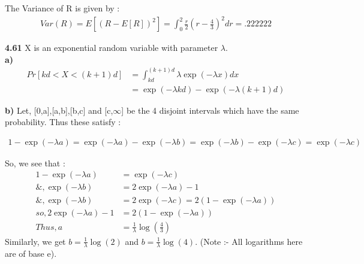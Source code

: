 \documentclass{article}
\begin{document}
The Variance of R is given by :
\begin{align*}
Var(R) = E[{(R-E[R])}^2] = \int_{0}^{2}\frac{r}{2}(r - \frac{4}{3})^2 dr = .222222
\end{align*}

\vspace{ 5 mm}

{\bf 4.61} X is an exponential random variable with parameter $\lambda$. \\

{\bf a)} 
\begin{align*}
Pr[kd < X < (k + 1)d] &= \int_{k d}^{(k+1) d} \lambda \exp(-\lambda x) dx \\
                     &= \exp(-\lambda k d) - \exp(-\lambda (k+1) d)
\end{align*}

\vspace{2 mm}

{\bf b)}  Let, [0,a],[a,b],[b,c] and [c,$\infty$] be the 4 disjoint intervals which have the same probability. Thus these satisfy :

\begin{align*}
 1- \exp(-\lambda a) = \exp(-\lambda a) - \exp(-\lambda b) = \exp(-\lambda b) - \exp(-\lambda c) = \exp(-\lambda c)
\end{align*}
 
So, we see that : 
\begin{align*}
1- \exp(-\lambda a) &=  \exp(-\lambda c) \\
\&, \exp(-\lambda b) &= 2 \exp(-\lambda a) -1 \\
\&, \exp(-\lambda b) &= 2 \exp(-\lambda c) = 2 (1 -\exp(-\lambda a) )\\
so, 2 \exp(-\lambda a) -1 &= 2 (1 -\exp(-\lambda a) ) \\ 
Thus, a &= \frac{1}{\lambda} \log(\frac{4}{3})
\end{align*} 
Similarly, we get $b = \frac{1}{\lambda} \log(2)$ and $b = \frac{1}{\lambda} \log(4)$. (Note :- All logarithms here are of base e).  
\end{document}
